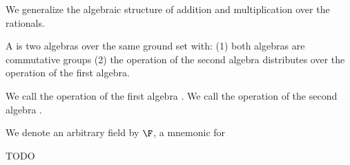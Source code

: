 

We generalize the algebraic structure of
addition and multiplication over the
rationals.


A  is two algebras over
the same ground set with:
(1) both algebras are commutative groups
(2) the operation of the second algebra
distributes over the operation of the first
algebra.

We call the operation of the first algebra
.
We call the operation of the second algebra
.


We denote an arbitrary field by $\F$, a mnemonic for 

TODO
